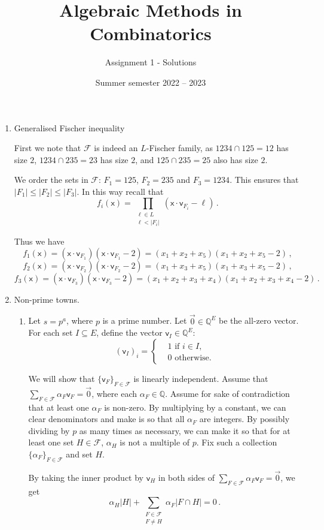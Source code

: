 \documentclass[kulak]{tplt}
\title{Algebraic Methods in Combinatorics}
\author{Assignment 1 - Solutions}
\date{Summer semester 2022 -- 2023}
\theoremstyle{definition}
\newcommand{\Q}{\mathbb{Q}}
\newcommand{\FF}{\mathcal F}
\newcommand{\vv}{\mathsf{v}}
\newcommand{\vx}{\mathsf{x}}
\begin{document}
\maketitle
\begin{enumerate}
\item Generalised Fischer inequality

First we note that $\FF $ is indeed an $L$-Fischer family, as $1234 \cap 125 = 12 $ has size $2$, $1234 \cap 235 = 23 $ has size $2$, and $125 \cap 235 = 25 $ also has size $2$.

We order the sets in $\FF $: $F_1 = 125$, $F_2 = 235$ and $F_3 = 1234$.
This ensures that $|F_1 | \leq |F_2| \leq |F_3|$.
In this way recall that
$$f_i (\vx) = \prod_{\substack{\ell \in L \\ \ell < |F_i|}} (\vx \cdot \vv_{F_i} - \ell ) \, . $$

Thus we have 
$$f_1(\vx) = ( \vx \cdot \vv_{F_1} ) (\vx \cdot \vv_{F_1} - 2 ) = (x_1 + x_2 + x_5 ) (x_1 + x_2 + x_5 - 2) \,  , $$
$$f_2(\vx) = ( \vx \cdot \vv_{F_2} ) (\vx \cdot \vv_{F_2} - 2 ) = (x_1 + x_3 + x_5 ) (x_1 + x_3 + x_5 - 2) \,  , $$
$$f_3(\vx) = ( \vx \cdot \vv_{F_3} ) (\vx \cdot \vv_{F_3} - 2 ) = (x_1 + x_2 + x_3 + x_4 ) (x_1 + x_2 + x_3 + x_4 - 2) \,  . $$


\item Non-prime towns.

\begin{enumerate}
\item 
Let $s = p^a$, where $p$ is a prime number.
Let $\vec{0} \in\Q^E$ be the all-zero vector.
For each set $I \subseteq E$, define the vector $\vv_I \in \Q^E$:
$$ (\vv_I)_i =\begin{cases*}
      & 1 \text{ if $i \in I$,}\\
      & 0 \text{ otherwise.}
    \end{cases*} $$

We will show that $\{\vv_F\}_{F\in \FF}$ is linearly independent.
Assume that $\sum_{F \in \FF} \alpha_F \vv_F = \vec{0}$, where each $\alpha_F \in \Q$.
Assume for sake of contradiction that at least one $\alpha_F$ is non-zero.
By multiplying by a constant, we can clear denominators and make is so that all $\alpha_F$ are integers.
By possibly dividing by $p$ as many times as necessary, we can make it so that for at least one set $H\in \FF$, $\alpha_H$ is not a multiple of $p$.
Fix such a collection $\{\alpha_F\}_{F \in \FF}$ and set $H$.

By taking the inner product by $\vv_H$ in both sides of $\sum_{F \in \FF} \alpha_F \vv_F = \vec{0}$, we get
$$\alpha_H |H| + \sum_{\substack{F \in \FF\\ F \neq H}} \alpha_F |F \cap H| =  0  \, .$$


\end{enumerate}
\end{enumerate}
\end{document}
